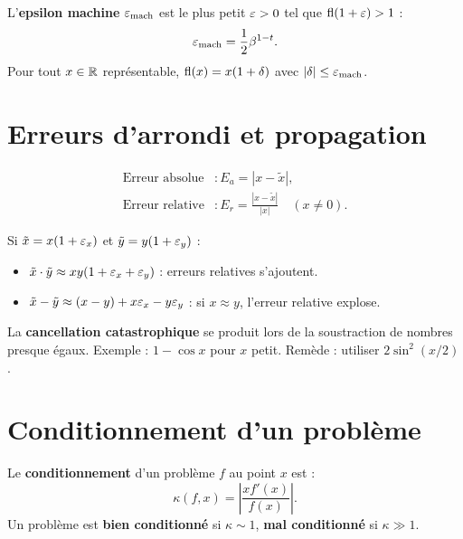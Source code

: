 \begin{definition}
L'\textbf{epsilon machine} $\varepsilon_{\mathrm{mach}}$ est le plus petit $\varepsilon>0$ tel que $\mathrm{fl}(1+\varepsilon)>1$ :
\[
\varepsilon_{\mathrm{mach}} = \frac{1}{2}\beta^{1-t}.
\]
Pour tout $x\in\mathbb{R}$ repr\'esentable, $\mathrm{fl}(x)=x(1+\delta)$ avec $|\delta|\leq\varepsilon_{\mathrm{mach}}$.
\end{definition}

\section{Erreurs d'arrondi et propagation}

\begin{definition}
\begin{align}
\text{Erreur absolue} &: E_a = |x-\tilde{x}|, \\
\text{Erreur relative} &: E_r = \frac{|x-\tilde{x}|}{|x|} \quad (x\neq 0).
\end{align}
\end{definition}

\begin{theoreme}
Si $\tilde{x}=x(1+\varepsilon_x)$ et $\tilde{y}=y(1+\varepsilon_y)$ :
\begin{itemize}
\item $\tilde{x}\cdot\tilde{y}\approx xy(1+\varepsilon_x+\varepsilon_y)$ : erreurs relatives s'ajoutent.
\item $\tilde{x}-\tilde{y}\approx(x-y)+x\varepsilon_x-y\varepsilon_y$ : si $x\approx y$, l'erreur relative explose.
\end{itemize}
\end{theoreme}

\begin{attention}
La \textbf{cancellation catastrophique} se produit lors de la soustraction de nombres presque \'egaux. Exemple : $1-\cos x$ pour $x$ petit. Rem\`ede : utiliser $2\sin^2(x/2)$.
\end{attention}

\section{Conditionnement d'un probl\`eme}

\begin{definition}[Conditionnement]
Le \textbf{conditionnement} d'un probl\`eme $f$ au point $x$ est :
\[
\kappa(f,x) = \left|\frac{xf'(x)}{f(x)}\right|.
\]
Un probl\`eme est \textbf{bien conditionn\'e} si $\kappa\sim 1$, \textbf{mal conditionn\'e} si $\kappa\gg 1$.
\end{definition}

